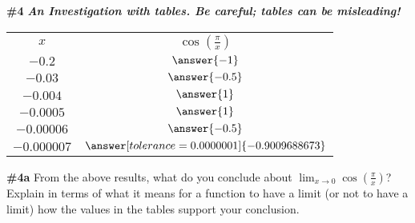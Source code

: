 \documentclass[handout,nooutcomes]{ximera}
\begin{document}
\begin{problem}{\textbf{\#4 }}{\textbf{\textit{An Investigation with tables. Be careful; tables can be misleading! }}}
\bigskip
\bigskip

\begin{tabular}{|c|c|}

\hline
		$x$ & $\cos\left(\frac{\pi}{x}\right)$\\
		
        $-0.2$ & $\answer{-1}$\\
		
		$-0.03$ & $\answer{-0.5}$\\
		
		$-0.004$ & $\answer{1}$\\
		
		$-0.0005$ & $\answer{1}$\\
		
		$-0.00006$ & $\answer{-0.5}$ \\
		
		$-0.000007$ & $\answer[tolerance=0.0000001]{-0.9009688673}$ \\

		
\end{tabular}



    \begin{problem}{\textbf{\#4a}}
    From the above results, what do you conclude about $\displaystyle\lim_{x\rightarrow 0}\cos\left(\frac{\pi}{x}\right)$? Explain in terms of what it means for a function to have a limit (or not to have a limit) how the values in the tables support your conclusion.
    \end{problem}
    
\end{problem}
\end{document}
